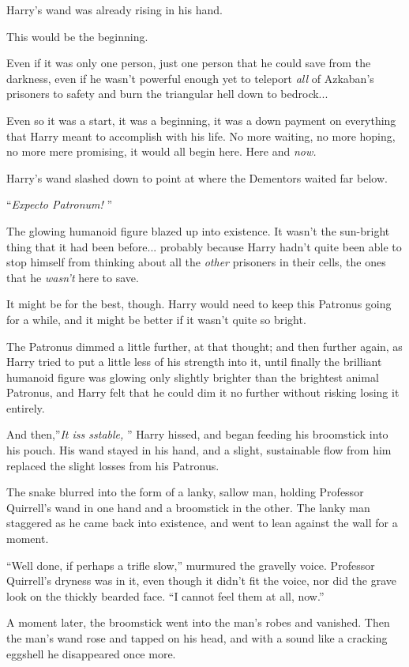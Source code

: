 Harry's wand was already rising in his hand.

This would be the beginning.

Even if it was only one person, just one person that he could save from
the darkness, even if he wasn't powerful enough yet to teleport
\emph{all} of Azkaban's prisoners to safety and burn the triangular hell
down to bedrock...

Even so it was a start, it was a beginning, it was a down payment on
everything that Harry meant to accomplish with his life. No more
waiting, no more hoping, no more mere promising, it would all begin
here. Here and \emph{now.}

Harry's wand slashed down to point at where the Dementors waited far
below.

``\emph{Expecto Patronum!} ''

The glowing humanoid figure blazed up into existence. It wasn't the
sun-bright thing that it had been before... probably because Harry
hadn't quite been able to stop himself from thinking about all the
\emph{other} prisoners in their cells, the ones that he \emph{wasn't}
here to save.

It might be for the best, though. Harry would need to keep this Patronus
going for a while, and it might be better if it wasn't quite so bright.

The Patronus dimmed a little further, at that thought; and then further
again, as Harry tried to put a little less of his strength into it,
until finally the brilliant humanoid figure was glowing only slightly
brighter than the brightest animal Patronus, and Harry felt that he
could dim it no further without risking losing it entirely.

And then,''\emph{It iss sstable,} '' Harry hissed, and began feeding his
broomstick into his pouch. His wand stayed in his hand, and a slight,
sustainable flow from him replaced the slight losses from his Patronus.

The snake blurred into the form of a lanky, sallow man, holding
Professor Quirrell's wand in one hand and a broomstick in the other. The
lanky man staggered as he came back into existence, and went to lean
against the wall for a moment.

``Well done, if perhaps a trifle slow,'' murmured the gravelly voice.
Professor Quirrell's dryness was in it, even though it didn't fit the
voice, nor did the grave look on the thickly bearded face. ``I cannot
feel them at all, now.''

A moment later, the broomstick went into the man's robes and vanished.
Then the man's wand rose and tapped on his head, and with a sound like a
cracking eggshell he disappeared once more.


